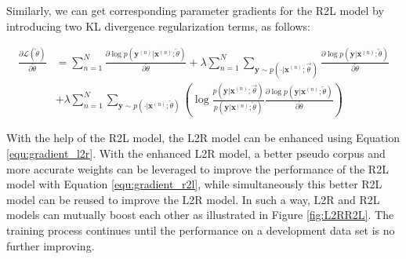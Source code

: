 \documentclass[a4paper]{article}
\begin{document}
\begin{CJK*}{UTF8}{gbsn}
Similarly, we can get corresponding parameter gradients for the R2L model by introducing two KL divergence regularization terms, as follows:

\begin{equation}
\begin{aligned}
\frac{ \partial  \mathcal{L}(\overleftarrow{\theta}) }{ \partial \overleftarrow{\theta}} & = \sum_{n=1}^{N} \frac{ \partial  \log{ p(\mathbf{y}^{(n)}| \mathbf{x}^{(n)};\overleftarrow{\theta} )} }{ \partial \overleftarrow{\theta} }  
 + \lambda \sum_{n=1}^{N} \sum_{\mathbf{y} \sim p(\cdot|\mathbf{x}^{(n)}; \overrightarrow{\theta} )} \frac{\partial \log p(\mathbf{y}|\mathbf{x}^{(n)}; \overleftarrow{\theta} ) }{\partial \overleftarrow{\theta}} \\
& + \lambda \sum_{n=1}^{N} \sum_{\mathbf{y} \sim p(\cdot|\mathbf{x}^{(n)}; \overleftarrow{\theta} )}
 \left( \log \frac{p(\mathbf{y}|\mathbf{x}^{(n)}; \overrightarrow{\theta} )}{ p(\mathbf{y}|\mathbf{x}^{(n)}; \overleftarrow{\theta} )} 
\frac{\partial \log p(\mathbf{y}|\mathbf{x}^{(n)}; \overleftarrow{\theta} ) }{\partial \overleftarrow{\theta}} \right)
\end{aligned}
\label{equ:gradient_r2l}
\end{equation}



With the help of the R2L model, the L2R model can be enhanced using Equation \ref{equ:gradient_l2r}. With the enhanced L2R model, a better pseudo corpus and more accurate weights can be leveraged to improve the performance of the R2L model with Equation \ref{equ:gradient_r2l}, while simultaneously this better R2L model can be reused to improve the L2R model. In such a way, L2R and R2L models can mutually boost each other as illustrated in Figure \ref{fig:L2RR2L}. The training process continues until the performance on a development data set is no further improving.






\end{CJK*}
\end{document}
